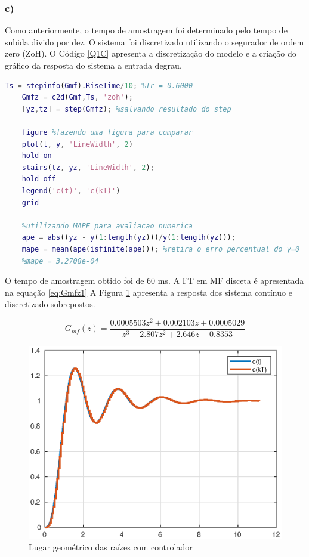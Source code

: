 \newpage    
    \subsubsection*{c)}

        Como anteriormente, o tempo de amostragem foi determinado pelo tempo de subida divido por dez. 
        O sistema foi discretizado utilizando o segurador de ordem zero (ZoH). O Código \ref{Q1C} apresenta
        a discretização do modelo e a criação do gráfico da resposta do sistema a entrada degrau.

        \begin{lstlisting}[language=Matlab,label=Q1C,caption=Análise da estabilidade]
    Ts = stepinfo(Gmf).RiseTime/10; %Tr = 0.6000
    Gmfz = c2d(Gmf,Ts, 'zoh');
    [yz,tz] = step(Gmfz); %salvando resultado do step

    figure %fazendo uma figura para comparar
    plot(t, y, 'LineWidth', 2)
    hold on
    stairs(tz, yz, 'LineWidth', 2);
    hold off
    legend('c(t)', 'c(kT)')
    grid

    %utilizando MAPE para avaliacao numerica
    ape = abs((yz - y(1:length(yz)))/y(1:length(yz))); 
    mape = mean(ape(isfinite(ape))); %retira o erro percentual do y=0
    %mape = 3.2708e-04
        \end{lstlisting}

    O tempo de amostragem obtido foi de 60 ms. A FT em MF disceta é apresentada na equação \ref{eq:Gmfz1}
    A Figura \ref{fig:Stepctds} apresenta a resposta dos sistema
    contínuo e discretizado sobrepostos. 

    \begin{equation}
        G_{mf}(z) = \frac{0.0005503 z^2 + 0.002103 z + 0.0005029}{z^3 - 2.807 z^2 + 2.646 z - 0.8353}
        \label{eq:Gmfz1}
    \end{equation}


    \begin{figure}[!h]
        \centering
        \includegraphics[width = 0.75\linewidth]{Figuras/ProblemasPI/Problema1/resposta_ao_degrau.eps}
        \caption{Lugar geométrico das raízes com controlador}
        \label{fig:Stepctds}                   
    \end{figure}

